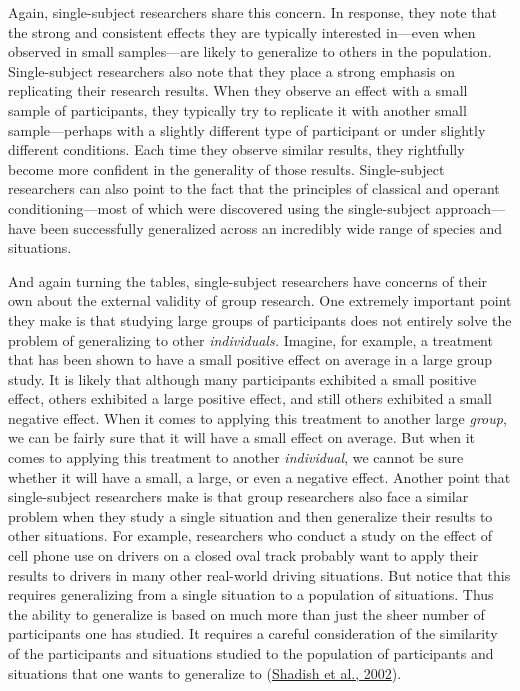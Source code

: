 \documentclass[
]{krantz}
\begin{document}
Again, single-subject researchers share this concern. In response, they note that the strong and consistent effects they are typically interested in---even when observed in small samples---are likely to generalize to others in the population. Single-subject researchers also note that they place a strong emphasis on replicating their research results. When they observe an effect with a small sample of participants, they typically try to replicate it with another small sample---perhaps with a slightly different type of participant or under slightly different conditions. Each time they observe similar results, they rightfully become more confident in the generality of those results. Single-subject researchers can also point to the fact that the principles of classical and operant conditioning---most of which were discovered using the single-subject approach---have been successfully generalized across an incredibly wide range of species and situations.

And again turning the tables, single-subject researchers have concerns of their own about the external validity of group research. One extremely important point they make is that studying large groups of participants does not entirely solve the problem of generalizing to other \emph{individuals.} Imagine, for example, a treatment that has been shown to have a small positive effect on average in a large group study. It is likely that although many participants exhibited a small positive effect, others exhibited a large positive effect, and still others exhibited a small negative effect. When it comes to applying this treatment to another large \emph{group}, we can be fairly sure that it will have a small effect on average. But when it comes to applying this treatment to another \emph{individual}, we cannot be sure whether it will have a small, a large, or even a negative effect. Another point that single-subject researchers make is that group researchers also face a similar problem when they study a single situation and then generalize their results to other situations. For example, researchers who conduct a study on the effect of cell phone use on drivers on a closed oval track probably want to apply their results to drivers in many other real-world driving situations. But notice that this requires generalizing from a single situation to a population of situations. Thus the ability to generalize is based on much more than just the sheer number of participants one has studied. It requires a careful consideration of the similarity of the participants and situations studied to the population of participants and situations that one wants to generalize to (\protect\hyperlink{ref-shadish2002experimental}{Shadish et al., 2002}).
\end{document}
